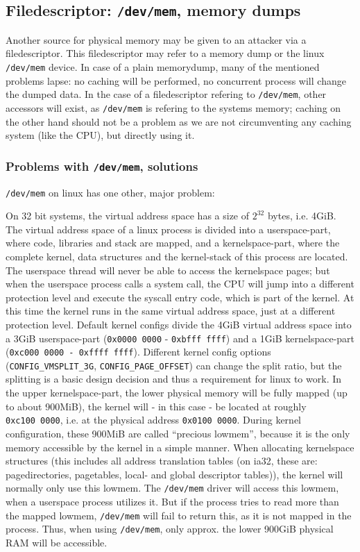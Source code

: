 \subsection{Filedescriptor: \texttt{/dev/mem}, memory dumps}

Another source for physical memory may be given to an attacker via a
filedescriptor. This filedescriptor may refer to a memory dump or the linux
\texttt{/dev/mem} device. In case of a plain memorydump, many of the mentioned
problems lapse: no caching will be performed, no concurrent process will change
the dumped data. In the case of a filedescriptor refering to \texttt{/dev/mem},
other accessors will exist, as \texttt{/dev/mem} is refering to the systems
memory; caching on the other hand should not be a problem as we are not
circumventing any caching system (like the CPU), but directly using it.

\subsubsection{Problems with \texttt{/dev/mem}, solutions}

\texttt{/dev/mem} on linux has one other, major problem:

\label{kerneluserdivision} On 32 bit systems, the virtual address space has a
size of $2^{32}$ bytes, i.e.  4GiB.  The virtual address space of a linux
process is divided into a userspace-part, where code, libraries and stack are
mapped, and a kernelspace-part, where the complete kernel, data structures and
the kernel-stack of this process are located. The userspace thread will never be
able to access the kernelspace pages; but when the userspace process calls a
system call, the CPU will jump into a different protection level and execute the
syscall entry code, which is part of the kernel. At this time the kernel runs in
the same virtual address space, just at a different protection level. Default
kernel configs divide the 4GiB virtual address space into a 3GiB userspace-part
(\texttt{0x0000~0000} - \texttt{0xbfff~ffff}) and a 1GiB kernelspace-part
(\texttt{0xc000~0000 - 0xffff~ffff}).  Different kernel config options
(\texttt{CONFIG\_VMSPLIT\_3G}, \texttt{CONFIG\_PAGE\_OFFSET}) can change the
split ratio, but the splitting is a basic design decision and thus a requirement
for linux to work. In the upper kernelspace-part, the lower physical memory will
be fully mapped (up to about 900MiB), the kernel will - in this case - be
located at roughly \texttt{0xc100~0000}, i.e. at the physical address
\texttt{0x0100~0000}. During kernel configuration, these 900MiB are called
``precious lowmem'', because it is the only memory accessible by the kernel in a
simple manner. When allocating kernelspace structures (this includes all address
translation tables (on ia32, these are: pagedirectories, pagetables, local- and
global descriptor tables)\label{linuxATTinlowmem}), the kernel will normally
only use this lowmem.  The \texttt{/dev/mem} driver will access this lowmem,
when a userspace process utilizes it. But if the process tries to read more than
the mapped lowmem, \texttt{/dev/mem} will fail to return this, as it is not
mapped in the process.  Thus, when using \texttt{/dev/mem}, only approx.  the
lower 900GiB physical RAM will be accessible.

